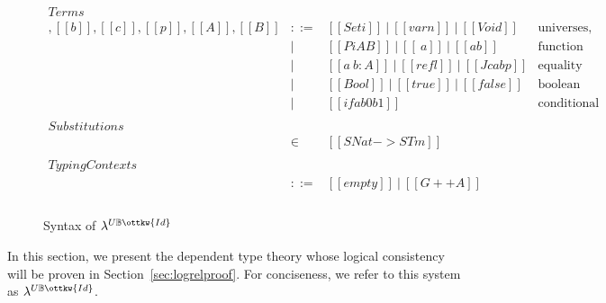 \documentclass[acmsmall,screen=true,
\ifpublic review=false\else,review=true\fi
  ,anonymous=\ifanonymous true\else false\fi]{acmart}
\newcommand{\lang}{$\lambda^{U\mathbb{B}\ottkw{Id}}$\xspace}
\begin{document}
\begin{figure}[h]
\[
\begin{array}{lcll}
\mathit{Terms}\\
[[a]],[[b]],[[c]],[[p]],[[A]],[[B]] & ::= & [[Set i]]\ |\ [[var n]]\  |\ [[Void]]
                  & \mbox{universes, variables, empty type} \\
            & |   & [[Pi A B]]\ |\ [[\ a]]\ |\ [[a b]]
                  & \mbox{function types, abstractions, applications} \\
            & |   & [[a ~ b : A ]]\ |\  [[refl]]\ |\ [[J c a b p]]
                  & \mbox{equality types, reflexivity proof, J eliminator} \\
            & |   & [[Bool]]\ |\  [[true]]\ |\  [[false]]\ %
                  & \mbox{boolean type, true, false} \\
            & |   & [[if a b0 b1]]
                  & \mbox{conditional expression} \\ \\
\mathit{Substitutions}\\
[[rho]] & \in & [[SNat -> STm]] & \\ \\
\mathit{Typing Contexts}\\
 [[G]]       & ::= & [[empty]]\ |\ [[G ++ A]] &  \\ \\
\end{array}
\]
  \caption{Syntax of \lang}
  \label{fig:syntax}
\end{figure}


In this section, we present the dependent type theory whose logical
consistency will be proven in Section~\ref{sec:logrelproof}. For conciseness,
we refer to this system as \lang.
\end{document}
